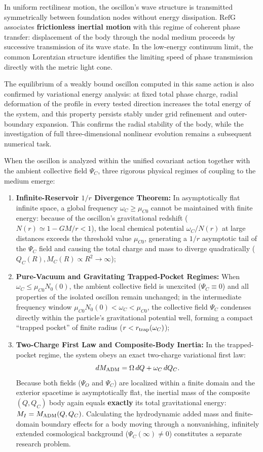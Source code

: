 \documentclass[11pt,a4paper]{article}
\newcommand{\RefG}{\mathrm{RefG}}
\begin{document}
In uniform rectilinear motion, the oscillon's wave structure is transmitted symmetrically between foundation nodes without energy dissipation. $\RefG$ associates \textbf{frictionless inertial motion} with this regime of coherent phase transfer: displacement of the body through the nodal medium proceeds by successive transmission of its wave state. In the low-energy continuum limit, the common Lorentzian structure identifies the limiting speed of phase transmission directly with the metric light cone.

The equilibrium of a weakly bound oscillon computed in this same action is also confirmed by variational energy analysis: at fixed total phase charge, radial deformation of the profile in every tested direction increases the total energy of the system, and this property persists stably under grid refinement and outer-boundary expansion. This confirms the radial stability of the body, while the investigation of full three-dimensional nonlinear evolution remains a subsequent numerical task.

When the oscillon is analyzed within the unified covariant action together with the ambient collective field $\Psi_C$, three rigorous physical regimes of coupling to the medium emerge:
\begin{enumerate}[label=\arabic*.]
\item \textbf{Infinite-Reservoir $1/r$ Divergence Theorem:} In asymptotically flat infinite space, a global frequency $\omega_C \ge \mu_{C0}$ cannot be maintained with finite energy: because of the oscillon's gravitational redshift ($N(r) \simeq 1 - GM/r < 1$), the local chemical potential $\omega_C/N(r)$ at large distances exceeds the threshold value $\mu_{C0}$, generating a $1/r$ asymptotic tail of the $\Psi_C$ field and causing the total charge and mass to diverge quadratically ($Q_C(R), M_C(R) \propto R^2 \to \infty$);
\item \textbf{Pure-Vacuum and Gravitating Trapped-Pocket Regimes:} When $\omega_C \le \mu_{C0} N_0(0)$, the ambient collective field is unexcited ($\Psi_C \equiv 0$) and all properties of the isolated oscillon remain unchanged; in the intermediate frequency window $\mu_{C0} N_0(0) < \omega_C < \mu_{C0}$, the collective field $\Psi_C$ condenses directly within the particle's gravitational potential well, forming a compact ``trapped pocket'' of finite radius ($r < r_{\rm trap}(\omega_C)$);
\item \textbf{Two-Charge First Law and Composite-Body Inertia:} In the trapped-pocket regime, the system obeys an exact two-charge variational first law:
\begin{equation}
dM_{\rm ADM} = \Omega\,dQ + \omega_C\,dQ_C.
\end{equation}
Because both fields ($\Psi_O$ and $\Psi_C$) are localized within a finite domain and the exterior spacetime is asymptotically flat, the inertial mass of the composite $(Q, Q_C)$ body again equals \textbf{exactly} its total gravitational energy: $M_I = M_{\rm ADM}(Q, Q_C)$. Calculating the hydrodynamic added mass and finite-domain boundary effects for a body moving through a nonvanishing, infinitely extended cosmological background ($\Psi_C(\infty) \neq 0$) constitutes a separate research problem.
\end{enumerate}
\end{document}
